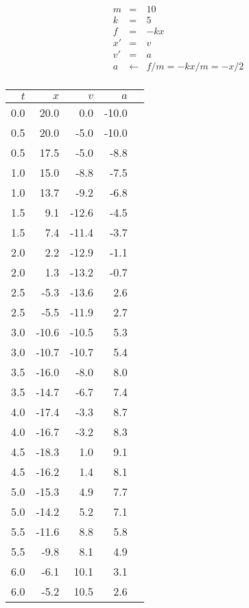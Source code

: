 \documentclass{beamer}
\begin{document}
\begin{minipage}{2in}
\begin{eqnarray*}
m &=& 10  \\
k &=& 5   \\
f &=& -kx \\
x' &=& v \\
v' &=& a \\
a &\leftarrow& f/m = -kx/m = -x/2 \\
\end{eqnarray*}
\end{minipage}
\hfill\begin{minipage}{2in}
{\scriptsize
\begin{tabular}{r|rrrr}
$t$ & $x$ & $v$ & $a$ \\\hline
0.0  &  20.0  &  0.0  &  -10.0  &  \\
0.5  &  20.0  &  -5.0  &  -10.0  &  \\
0.5  &  17.5  &  -5.0  &  -8.8  &  \\
1.0  &  15.0  &  -8.8  &  -7.5  &  \\
1.0  &  13.7  &  -9.2  &  -6.8  &  \\
1.5  &  9.1  &  -12.6  &  -4.5  &  \\
1.5  &  7.4  &  -11.4  &  -3.7  &  \\
2.0  &  2.2  &  -12.9  &  -1.1  &  \\
2.0  &  1.3  &  -13.2  &  -0.7  &  \\
2.5  &  -5.3  &  -13.6  &  2.6  &  \\
2.5  &  -5.5  &  -11.9  &  2.7  &  \\
3.0  &  -10.6  &  -10.5  &  5.3  &  \\
3.0  &  -10.7  &  -10.7  &  5.4  &  \\
3.5  &  -16.0  &  -8.0  &  8.0  &  \\
3.5  &  -14.7  &  -6.7  &  7.4  &  \\
4.0  &  -17.4  &  -3.3  &  8.7  &  \\
4.0  &  -16.7  &  -3.2  &  8.3  &  \\
4.5  &  -18.3  &  1.0  &  9.1  &  \\
4.5  &  -16.2  &  1.4  &  8.1  &  \\
5.0  &  -15.3  &  4.9  &  7.7  &  \\
5.0  &  -14.2  &  5.2  &  7.1  &  \\
5.5  &  -11.6  &  8.8  &  5.8  &  \\
5.5  &  -9.8  &  8.1  &  4.9  &  \\
6.0  &  -6.1  &  10.1  &  3.1  &  \\
6.0  &  -5.2  &  10.5  &  2.6  &  \\
\end{tabular}
}
\end{minipage}
\end{document}
